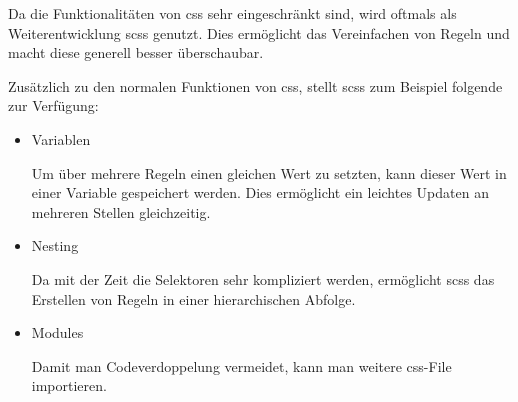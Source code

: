 Da die Funktionalitäten von \gls{css} sehr eingeschränkt sind, wird oftmals als Weiterentwicklung \gls{scss} genutzt. Dies ermöglicht das Vereinfachen von Regeln und macht diese generell besser überschaubar.

Zusätzlich zu den normalen Funktionen von \gls{css}, stellt \gls{scss} zum Beispiel folgende zur Verfügung: \cite{SCSS}

\begin{itemize}
    \item Variablen

          Um über mehrere Regeln einen gleichen Wert zu setzten, kann dieser Wert in einer Variable gespeichert werden. Dies ermöglicht ein leichtes Updaten an mehreren Stellen gleichzeitig.

    \item Nesting

          Da mit der Zeit die Selektoren sehr kompliziert werden, ermöglicht \gls{scss} das Erstellen von Regeln in einer hierarchischen Abfolge.

    \item Modules

          Damit man Codeverdoppelung vermeidet, kann man weitere \gls{css}-File importieren.
\end{itemize}